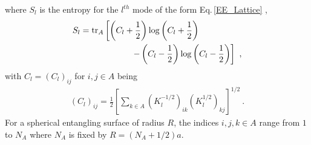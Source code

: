 where $S_l$ is the entropy for the $l^{th}$ mode of the form Eq.\,\eqref{EE_Lattice} ,
\begin{align}
\begin{aligned}
	S_l &= {\rm tr}_A \left[ \left( C_l + \frac{1}{2}\right) \log\left( C_l + \frac{1}{2}\right)\right. \\
		&\qquad \qquad \qquad\left.- \left( C_l - \frac{1}{2}\right) \log\left( C_l - \frac{1}{2}\right)\right] \ ,
\end{aligned}
\end{align}
with $C_l = (C_l)_{ij}$ for $i,j \in A$ being
\begin{align}
(C_l)_{ij} = \frac{1}{2}\left[\sum_{k\in A} (K_l^{-1/2})_{ik} (K_l^{1/2})_{kj}\right]^{1/2} \ .
\end{align}
For a spherical entangling surface of radius $R$, the indices $i,j,k \in A$ range from $1$ to $N_A$ where $N_A$ is fixed by $R = (N_A + 1/2)a$. 


\endinput